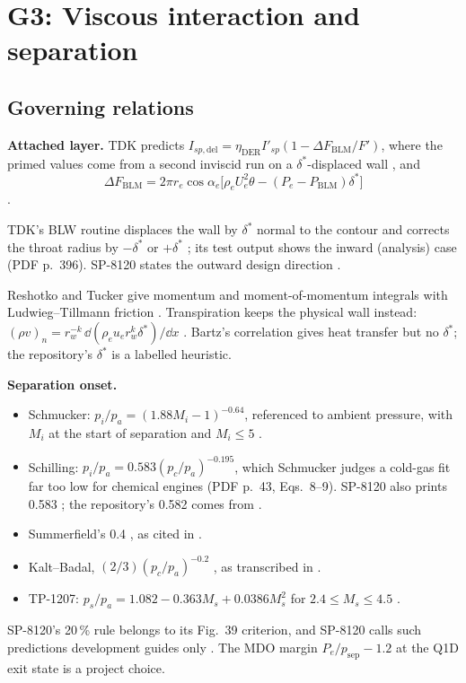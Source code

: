\section{G3: Viscous interaction and separation}
\label{sec:g3}
\subsection{Governing relations}
\textbf{Attached layer.} TDK predicts
$I_{sp,\mathrm{del}}=\eta_{\mathrm{DER}}I'_{sp}(1-\Delta F_{\mathrm{BLM}}/F')$, where the
primed values come from a second inviscid run on a $\delta^*$-displaced wall
\cite[PDF p.~26, printed p.~2-4]{nickerson1985}, and
\begin{equation}
\Delta F_{\mathrm{BLM}}=2\pi r_e\cos\alpha_e\big[\rho_eU_e^2\theta-(P_e-P_{\mathrm{BLM}})\delta^*\big]
\end{equation}
\cite[PDF p.~27, printed p.~2-5]{nickerson1985}.

TDK's BLW routine displaces the wall by $\delta^*$ normal to the contour and corrects
the throat radius by $-\delta^*$ or $+\delta^*$
\cite[Sec.~5.6.8, PDF p.~287, printed p.~5-161]{nickerson1985}; its test output shows
the inward (analysis) case (PDF p.~396). SP-8120 states the outward design direction
\cite[PDF p.~27, printed p.~13]{sp8120}.

Reshotko and Tucker give momentum and moment-of-momentum integrals with
Ludwieg--Tillmann friction \cite[PDF pp.~4--5, printed pp.~3--4, Eqs.~1--3]{reshotko1957}.
Transpiration keeps the physical wall instead:
$(\rho v)_n=r_w^{-k}\,\dd(\rho_eu_er_w^k\delta^*)/\dd x$
\cite[PDF p.~6, printed p.~1320, Eq.~19]{whitfield1981}. Bartz's correlation
\cite[PDF p.~2, printed p.~50, Eq.~7]{bartz1957} gives heat transfer but no $\delta^*$;
the repository's $\delta^*$ is a labelled heuristic.

\textbf{Separation onset.}
\begin{itemize}
\item Schmucker: $p_i/p_a=(1.88M_i-1)^{-0.64}$, referenced to ambient pressure, with
$M_i$ at the start of separation and $M_i\le5$
\cite[PDF pp.~44--45, printed pp.~38--39, Eq.~11]{schmucker1984}.
\item Schilling: $p_i/p_a=0.583(p_c/p_a)^{-0.195}$, which Schmucker judges a cold-gas
fit far too low for chemical engines (PDF p.~43, Eqs.~8--9). SP-8120 also prints 0.583
\cite[PDF p.~31, printed p.~17]{sp8120}; the repository's 0.582 comes from
\cite[PDF p.~52, printed p.~44, Eq.~29]{ostlund}.
\item Summerfield's 0.4 \cite{summerfield1954}, as cited in
\cite[PDF p.~43, Eq.~7]{schmucker1984}.
\item Kalt--Badal, $(2/3)(p_c/p_a)^{-0.2}$ \cite{kalt1965}, as transcribed in
\cite[PDF p.~52]{ostlund}.
\item TP-1207: $p_s/p_a=1.082-0.363M_s+0.0386M_s^2$ for $2.4\le M_s\le4.5$
\cite[PDF p.~13, printed p.~9, Eq.~10]{morrisette1978}.
\end{itemize}
SP-8120's 20\,\% rule belongs to its Fig.~39 criterion, and SP-8120 calls such
predictions development guides only \cite[PDF pp.~81--82, printed pp.~67--68]{sp8120}.
The MDO margin $P_e/p_{\mathrm{sep}}-1.2$ at the Q1D exit state is a project choice.

